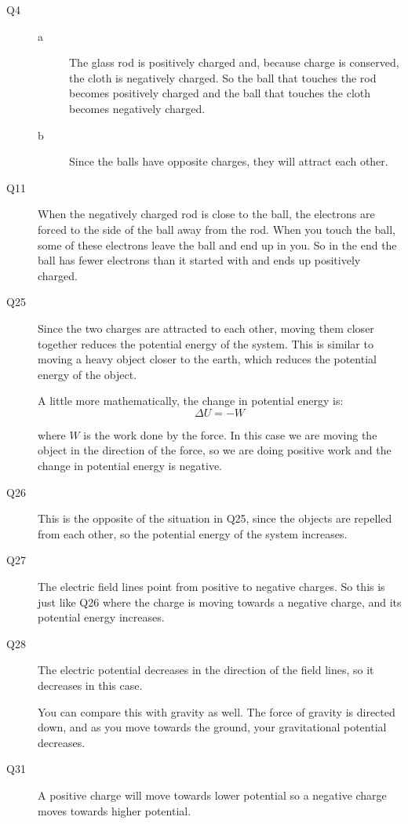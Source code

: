 \documentclass{exam}
\begin{document}
\begin{description}

\item[Q4]
\begin{description}

\item[a]
The glass rod is positively charged and, because charge is conserved, the cloth is negatively charged.  So the ball that
touches the rod becomes positively charged and the ball that touches the cloth becomes negatively charged.

\item[b]
Since the balls have opposite charges, they will attract each other.

\end{description}

\item[Q11]

When the negatively charged rod is close to the ball, the electrons are forced to the side of the ball away from the
rod.  When you touch the ball, some of these electrons leave the ball and end up in you.  So in the end the ball has
fewer electrons than it started with and ends up positively charged.

\item[Q25]
Since the two charges are attracted to each other, moving them closer together reduces the potential energy of the
system.  This is similar to moving a heavy object closer to the earth, which reduces the potential energy of the object.

A little more mathematically, the change in potential energy is:
\[
  \Delta U = - W
\]

where $W$ is the work done by the force.  In this case we are moving the object in the direction of the force, so we are
doing positive work and the change in potential energy is negative.

\item[Q26]
This is the opposite of the situation in Q25, since the objects are repelled from each other, so the potential energy of
the system increases.

\item[Q27]
The electric field lines point from positive to negative charges.  So this is just like Q26 where the charge is moving
towards a negative charge, and its potential energy increases.

\item[Q28]
The electric potential decreases in the direction of the field lines, so it decreases in this case.

You can compare this with gravity as well.  The force of gravity is directed down, and as you move towards the ground,
your gravitational potential decreases.

\item[Q31]
A positive charge will move towards lower potential so a negative charge moves towards higher potential.  
\end{description}
\end{document}
